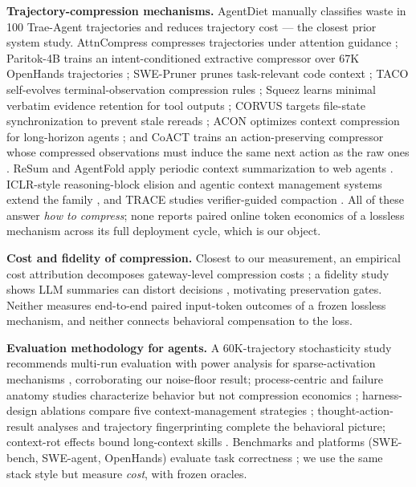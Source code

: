 \documentclass[twocolumn]{svjour3}       %
\begin{document}
\textbf{Trajectory-compression mechanisms.} AgentDiet manually classifies waste in 100
Trae-Agent trajectories and reduces trajectory cost \cite{agentdiet2026} --- the closest
prior system study. AttnCompress compresses trajectories under attention guidance
\cite{attncompress2026}; Paritok-4B trains an intent-conditioned extractive compressor
over 67K OpenHands trajectories \cite{paritok4b2026}; SWE-Pruner prunes task-relevant
code context \cite{swepruner2026}; TACO self-evolves terminal-observation compression
rules \cite{taco2026}; Squeez learns minimal verbatim evidence retention for tool outputs
\cite{squeez2026}; CORVUS targets file-state synchronization to prevent stale rereads
\cite{corvus2026}; ACON optimizes context compression for long-horizon agents
\cite{acon2026}; and CoACT trains an action-preserving compressor whose compressed
observations must induce the same next action as the raw ones \cite{coact2026}. ReSum
and AgentFold apply periodic context summarization to web agents
\cite{resume2025,agentfold2025}. ICLR-style reasoning-block elision and agentic context
management systems extend the family \cite{iclr_compression2026,acm_acm2026,hasmem2026},
and TRACE studies verifier-guided compaction \cite{trace2026}. All of these answer
\emph{how to compress}; none reports paired online token economics of a lossless
mechanism across its full deployment cycle, which is our object.

\textbf{Cost and fidelity of compression.} Closest to our measurement, an empirical cost
attribution decomposes gateway-level compression costs \cite{costattribution2026}; a
fidelity study shows LLM summaries can distort decisions \cite{summariesdistort2026},
motivating preservation gates. Neither measures end-to-end paired input-token outcomes of
a frozen lossless mechanism, and neither connects behavioral compensation to the loss.

\textbf{Evaluation methodology for agents.} A 60K-trajectory stochasticity study recommends
multi-run evaluation with power analysis for sparse-activation mechanisms
\cite{randomness2026}, corroborating our noise-floor result; process-centric and failure
anatomy studies characterize behavior but not compression economics
\cite{processcentric2025,failureprocess2026}; harness-design ablations compare five
context-management strategies \cite{harnessdesign2026}; thought-action-result analyses
\cite{understandingseagents2025} and trajectory fingerprinting
\cite{trajectoriesprograms2026} complete the behavioral picture; context-rot effects
bound long-context skills \cite{contextrot2026}. Benchmarks and platforms (SWE-bench,
SWE-agent, OpenHands) evaluate task correctness \cite{swebench2024,sweagent2024,openhands2024};
we use the same stack style but measure \emph{cost}, with frozen oracles.
\end{document}
